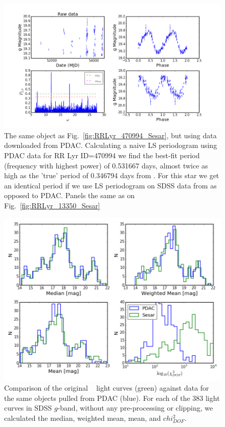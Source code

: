 \documentclass[DM,lsstdraft,toc,usenatbib]{lsstdoc}
\begin{document}
\begin{figure}
\includegraphics[width=\textwidth]{figs/Fig_2_RRLyr_LS_periodogram_ID_470994_gPDAC}
\caption{ The same object as Fig.~\ref{fig:RRLyr_470994_Sesar}, but using data downloaded from PDAC. Calculating a naive LS periodogram using PDAC data for RR Lyr ID=470994 we find the  best-fit period (frequency with highest power) of 0.531667  days, almost twice as high as the 'true'  period of 0.346794 days from  \citep{sesar2010}. For this star we get an identical period if we use LS periodogram on SDSS data from \citep{sesar2010} as opposed to PDAC. Panels the same as on Fig.~\ref{fig:RRLyr_13350_Sesar}}
\label{fig:RRLyr_470994_PDAC}
\end{figure}


\begin{figure}
\includegraphics[width=\columnwidth]{figs/Fig_PDAC_sesar_compare}
\caption{Comparison of the original ~\citep{sesar2010}  light curves (green) against data for the same objects  pulled from PDAC (blue). For each of the 383 light curves in SDSS $g$-band, without any pre-processing or clipping, we calculated the median, weighted mean, mean, and $chi^{2}_{DOF}$. }
\label{fig:PDAC_SDSS_comp}
\end{figure}
\end{document}
